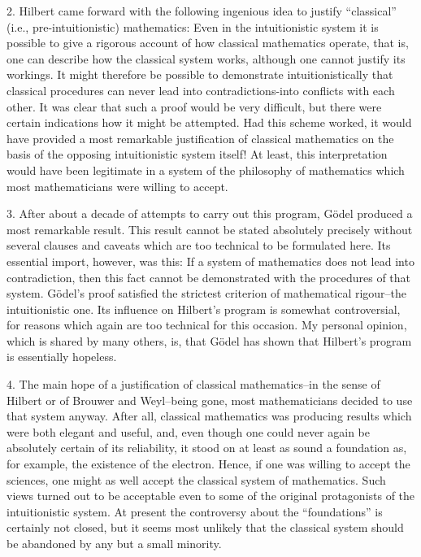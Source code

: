 \documentclass{article}
\begin{document}
2. Hilbert came forward with the following ingenious idea to justify ``classical'' (i.e., pre-intuitionistic) mathematics: Even in the intuitionistic system it is possible to give a rigorous account of how classical mathematics operate, that is, one can describe how the classical system works, although one cannot justify its workings. It might therefore be possible to demonstrate intuitionistically that classical procedures can never lead into contradictions-into conflicts with each other. It was clear that such a proof would be very difficult, but there were certain indications how it might be attempted. Had this scheme worked, it would have provided a most remarkable justification of classical mathematics on the basis of the opposing intuitionistic system itself! At least, this interpretation would have been legitimate in a system of the philosophy of mathematics which most mathematicians were willing to accept.

3. After about a decade of attempts to carry out this program, Gödel produced a most remarkable result. This result cannot be stated absolutely precisely without several clauses and caveats which are too technical to be formulated here. Its essential import, however, was this: If a system of mathematics does not lead into contradiction, then this fact cannot be demonstrated with the procedures of that system. Gödel's proof satisfied the strictest criterion of mathematical rigour--the intuitionistic one. Its influence on Hilbert's program is somewhat controversial, for reasons which again are too technical for this occasion. My personal opinion, which is shared by many others, is, that Gödel has shown that Hilbert's program is essentially hopeless.

4. The main hope of a justification of classical mathematics--in the sense of Hilbert or of Brouwer and Weyl--being gone, most mathematicians decided to use that system anyway. After all, classical mathematics was producing results which were both elegant and useful, and, even though one could never again be absolutely certain of its reliability, it stood on at least as sound a foundation as, for example, the existence of the electron. Hence, if one was willing to accept the sciences, one might as well accept the classical system of mathematics. Such views turned out to be acceptable even to some of the original protagonists of the intuitionistic system. At present the controversy about the ``foundations'' is certainly not closed, but it seems most unlikely that the classical system should be abandoned by any but a small minority.
\end{document}
